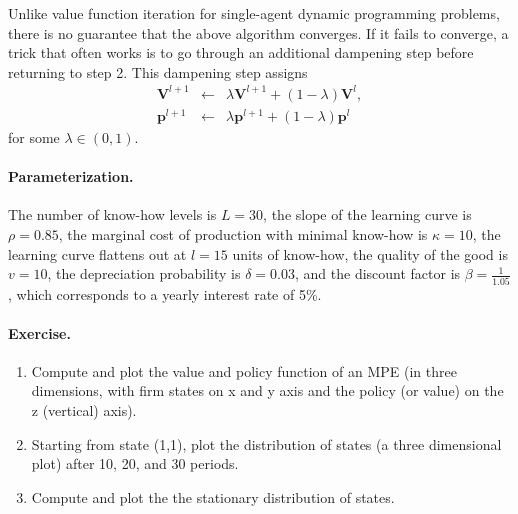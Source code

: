 \documentclass[11pt]{article}
\begin{document}
Unlike value function iteration for single-agent dynamic programming
problems, there is no guarantee that the above algorithm converges.
If it fails to converge, a trick that often works is to go through
an additional dampening step before returning to step 2. This
dampening step assigns
\begin{eqnarray*}
\mathbf{V}^{l+1} & \leftarrow & \lambda \mathbf{V}^{l+1} +(1-\lambda) \mathbf{V}^{l}, \\
\mathbf{p}^{l+1} & \leftarrow & \lambda \mathbf{p}^{l+1} +(1-\lambda) \mathbf{p}^{l}
\end{eqnarray*}
for some $\lambda \in (0,1)$.

\paragraph{Parameterization.}

The number of know-how levels is $L=30$, the slope of the learning
curve is $\rho=0.85$, the marginal cost of production with minimal
know-how is $\kappa=10$, the learning curve flattens out at $l=15$
units of know-how, the quality of the good is $v=10$, the
depreciation probability is $\delta=0.03$, and the discount factor
is $\beta=\frac{1}{1.05}$, which corresponds to a yearly interest
rate of 5\%.


\paragraph{Exercise.}

\begin{enumerate}
\item Compute and plot the value and policy function of an MPE (in three dimensions, with firm states on x and y axis and the policy (or value) on the z (vertical) axis). 
\item Starting from state (1,1), plot the distribution of states (a three dimensional plot) after 10, 20, and 30 periods.  
\item Compute and plot the the stationary distribution of states.
\end{enumerate}

%
%
\end{document}
